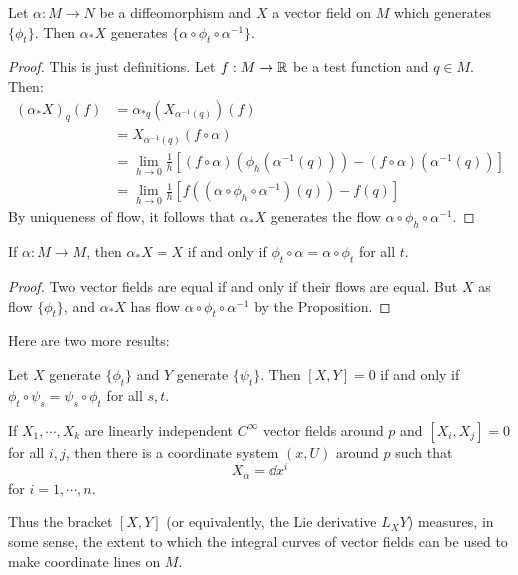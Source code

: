 \documentclass[11pt, english]{article}
\begin{document}
\begin{lemma}
 Let $\alpha:M \to N$ be a diffeomorphism and $X$ a vector field on $M$ which generates $\{ \phi_t \}$. Then $\alpha_\ast X$ generates $\{ \alpha \circ \phi_t \circ \alpha^{-1}\}$.
\end{lemma}
\begin{proof}
 This is just definitions. Let $f:M \to \mathbb{R}$ be a test function and $q \in M$. Then:
 \begin{align*}
 (\alpha_\ast X)_q(f) &= \alpha_{\ast q}(X_{\alpha^{-1}(q)})(f) \\
&= X_{\alpha^{-1}(q)}(f \circ \alpha) \\
&= \lim_{h \to 0}\frac 1h \left[ (f \circ \alpha)(\phi_h ( \alpha^{-1}(q))) - (f \circ \alpha)(\alpha^{-1}(q))  \right] \\
&= \lim_{h \to 0}\frac 1h \left[ f ((\alpha \circ \phi_h \circ \alpha^{-1})(q))- f(q) \right]
 \end{align*}
By uniqueness of flow, it follows that $\alpha_\ast X$ generates the flow $\alpha \circ \phi_h \circ \alpha^{-1}$. 
\end{proof}

\begin{corr}
  If $\alpha:M \to M$, then $\alpha_\ast X = X$ if and only if $\phi_t \circ \alpha = \alpha \circ \phi_t$ for all $t$.
\end{corr}
\begin{proof}
  Two vector fields are equal if and only if their flows are equal. But $X$ as flow $\{ \phi_t \}$, and $\alpha_\ast X$ has flow $\alpha \circ \phi_t \circ \alpha^{-1}$ by the Proposition.
\end{proof}


Here are two more results:
\begin{lemma}
 Let $X$ generate $\{ \phi_t \}$ and $Y$ generate $\{ \psi_t \}$. Then $[X,Y]=0$ if and only if $\phi_t \circ \psi_s = \psi_s \circ \phi_t$ for all $s,t$.
\end{lemma}

\begin{thm}
 If $X_1,\cdots,X_k$ are linearly independent $C^\infty$ vector fields around $p$ and $[X_i,X_j]=0$ for all $i,j$, then there is a coordinate system $(x,U)$ around $p$ such that
\[
X_\alpha = \dd{}{x^i}
\]
for $i=1,\cdots,n$. 
\end{thm}

Thus the bracket $[X,Y]$ (or equivalently, the Lie derivative $L_XY$) measures, in some sense, the extent to which the integral curves of vector fields can be used to make coordinate lines on $M$.
\end{document}
